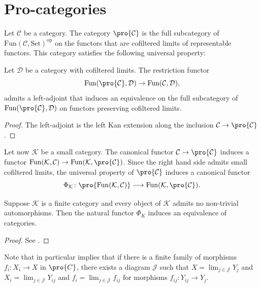\chapter{Pro-categories}

Let $\mathcal{C}$ be a category. The category $\pro{\mathcal{C}}$ is the full subcategory of
$\mathrm{Fun}(\mathcal{C}, \mathrm{Set})^{\mathrm{op}}$ on the functors that are cofiltered limits
of representable functors. This category satisfies the following universal property:

\begin{proposition}
    Let $\mathcal{D}$ be a category with cofiltered limits. The restriction functor
    \[
        \mathrm{Fun}(\pro{\mathcal{C}}, \mathcal{D}) \to \mathrm{Fun}(\mathcal{C}, \mathcal{D})
    ,\] admits a left-adjoint that induces an equivalence
    on the full subcategory of $\mathrm{Fun}(\pro{\mathcal{C}}, \mathcal{D})$ on functors preserving
    cofiltered limits.
    \label{prop:pro-univ-prop}
\end{proposition}

\begin{proof}
    The left-adjoint is the left Kan extension along the inclusion $\mathcal{C} \to \pro{\mathcal{C}}$.
\end{proof}

Let now $\mathcal{K}$ be a small category. The canonical functor $\mathcal{C} \to \pro{\mathcal{C}}$ induces
a functor $\mathrm{Fun}(\mathcal{K}, \mathcal{C}) \to \mathrm{Fun}(\mathcal{K}, \mathcal{\pro{\mathcal{C}}})$.
Since the right hand side admits small cofiltered limits, the universal property
of $\pro{\mathcal{C}}$ induces a canonical functor
\[
    \Phi_{\mathcal{K}}\colon \pro{\mathrm{Fun}(\mathcal{K}, \mathcal{C})} \longrightarrow
    \mathrm{Fun}(\mathcal{K}, \mathcal{\pro{\mathcal{C}}})
.\]

\begin{proposition}
    Suppose $\mathcal{K}$ is a finite category and every object of $\mathcal{K}$ admits no
    non-trivial automorphisms. Then the natural functor $\Phi_K$ induces
    an equivalence of categories.
    \label{prop:finite-diag-pro}
\end{proposition}

\begin{proof}
    See \cite[Theorem 6.4.3]{kashiwara-shapira}.
\end{proof}

\begin{example}
    \label{ex:finite-diag-pro}
    Note that  in particular implies that if there is a
    finite family of morphisms $f_i \colon X_i \to X$ in $\pro{C}$, there exists a diagram $\mathcal{J}$ such
    that $X = \lim_{j \in \mathcal{J}} Y_j$ and $X_i = \lim_{j \in \mathcal{J}} Y_{ij}$
    and $f_i = \lim_{j \in \mathcal{J}} f_{ij}$ for morphisms $f_{ij}\colon Y_{ij} \to Y_j$.
\end{example}

